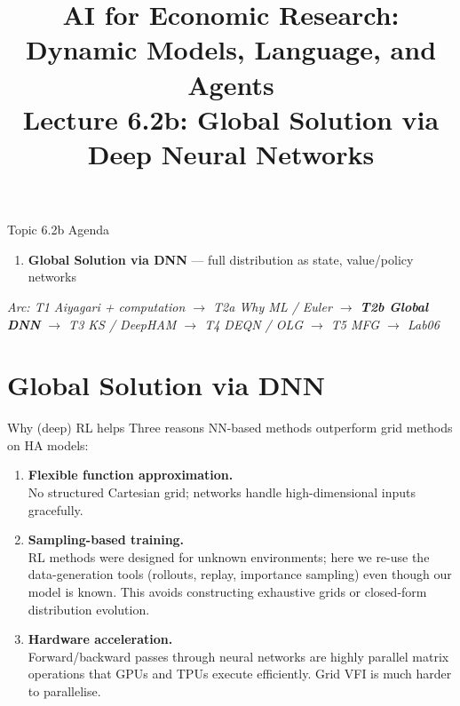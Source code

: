 


\graphicspath{{./pic/}{../../MiniCourse_8hr/Slides/Module2_DL_RL_Macro/pic/}{../}}

\title[AI for Econ Research]{AI for Economic Research: Dynamic Models, Language, and Agents\\
Lecture 6.2b: Global Solution via Deep Neural Networks}



\makebeamertitle

\begin{frame}{Topic 6.2b Agenda}
\begin{enumerate}
  \item \textbf{Global Solution via DNN} --- full distribution as state, value/policy networks
\end{enumerate}
\medskip
\textit{Arc: T1 Aiyagari + computation $\to$ T2a Why ML / Euler $\to$ \textbf{T2b Global DNN} $\to$ T3 KS / DeepHAM $\to$ T4 DEQN / OLG $\to$ T5 MFG $\to$ Lab06}
\end{frame}

\section{Global Solution via DNN}

\begin{frame}{Why (deep) RL helps}
Three reasons NN-based methods outperform grid methods on HA models:
\medskip
\begin{enumerate}
\item \textbf{Flexible function approximation.}\\
No structured Cartesian grid; networks handle high-dimensional inputs gracefully.
\medskip
\item \textbf{Sampling-based training.}\\
RL methods were designed for unknown environments; here we re-use the data-generation tools (rollouts, replay, importance sampling) even though our model is known. This avoids constructing exhaustive grids or closed-form distribution evolution.
\medskip
\item \textbf{Hardware acceleration.}\\
Forward/backward passes through neural networks are highly parallel matrix operations that GPUs and TPUs execute efficiently. Grid VFI is much harder to parallelise.
\end{enumerate}
\end{frame}

